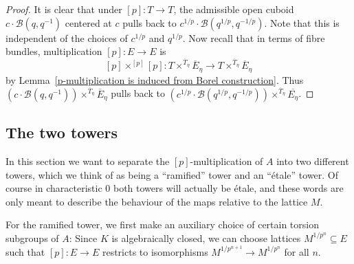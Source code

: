\documentclass[10pt,oneside]{amsart}
\theoremstyle{definition}
\begin{document}
	\begin{proof}
		It is clear that under $[p]:T\rightarrow T$, the admissible open cuboid $c\cdot \mathcal B(q,q^{-1})$ centered at $c$ pulls back to $c^{1/p}\cdot \mathcal B(q^{1/p},q^{-1/p})$. Note that this is independent of the choices of $c^{1/p}$ and $q^{1/p}$. Now recall that in terms of fibre bundles, multiplication $[p]:E\rightarrow E$ is
		\[[p]\times^{[p]}[p]: T\times^{\overline{T}_\eta}\overline{E}_\eta\rightarrow T\times^{\overline{T}_\eta}\overline{E}_\eta \]
		by Lemma~\ref{p-multiplication is induced from Borel construction}. Thus $(c\cdot \mathcal B(q,q^{-1}))\times^{\overline{T}_\eta}\overline{E}_\eta$ pulls back to $(c^{1/p}\cdot \mathcal B(q^{1/p},q^{-1/p}))\times^{\overline{T}_\eta}\overline{E_\eta}$.
	\end{proof}

	\subsection{The two towers}
	In this section we want to separate the $[p]$-multiplication of $A$ into two different towers, which we think of as being a ``ramified'' tower and an ``\'etale'' tower. Of course in characteristic $0$ both towers will actually be \'etale, and these words are only meant to describe the behaviour of the maps relative to the lattice $M$.
	
	For the ramified tower, we first make an auxiliary choice of certain torsion subgroups of $A$: Since $K$ is algebraically closed, we can choose lattices $M^{1/p^n}\subseteq E$ such that $[p]:E\rightarrow E$ restricts to isomorphisms $M^{1/p^{n+1}}\rightarrow M^{1/p^n}$ for all $n$.
	
\end{document}
